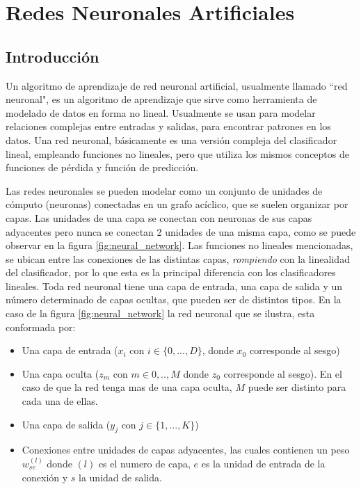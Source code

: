 \documentclass[a4paper,11pt,spanish]{book}
\begin{document}
    \section{Redes Neuronales Artificiales}\label{sec:redes_neuronales}

      \subsection{Introducción}
	Un algoritmo de aprendizaje de red neuronal artificial, usualmente llamado ``red neuronal", es un algoritmo de aprendizaje que sirve como herramienta de modelado de datos
	en forma no lineal. 
	Usualmente se usan para modelar relaciones complejas entre entradas y salidas, para encontrar patrones en los datos.
	Una red neuronal, básicamente es una versión compleja del clasificador lineal, empleando funciones no lineales, 
	pero que utiliza los mismos conceptos de funciones de pérdida y función de predicción.
	  
	Las redes neuronales se pueden modelar como un conjunto de unidades de cómputo (neuronas) conectadas en un grafo acíclico, que se suelen organizar por capas.
	Las unidades de una capa se conectan con neuronas de sus capas adyacentes pero nunca se conectan 2 unidades de una misma capa, como se puede observar en la figura 
	\ref{fig:neural_network}.
	Las funciones no lineales mencionadas, se ubican entre las conexiones de las distintas capas, \emph{rompiendo} con la linealidad del clasificador, por lo que esta es la principal
	diferencia con los clasificadores lineales.
	Toda red neuronal tiene una capa de entrada, una capa de salida y un número determinado de capas ocultas, que pueden ser de distintos tipos. 
	En la caso de la figura \ref{fig:neural_network} la red neuronal que se ilustra, esta conformada por:
	\begin{itemize}
	 \item Una capa de entrada ($x_i$ con $i \in \{0,...,D\}$, donde $x_0$ corresponde al sesgo)
	 \item Una capa oculta ($z_m$ con $m \in {0,..,M}$ donde $z_0$ corresponde al sesgo). En el caso de que la red tenga mas de una capa oculta, $M$ puede ser distinto 
	 para cada una de ellas.
	 \item Una capa de salida ($y_j$ con $j \in \{1,...,K\}$)
	 \item Conexiones entre unidades de capas adyacentes, las cuales contienen un peso $w^{(l)}_{se}$ donde $(l)$ es el numero de capa, $e$ es la unidad de entrada 
	 de la conexión y $s$ la unidad de salida.
	\end{itemize}
\end{document}
